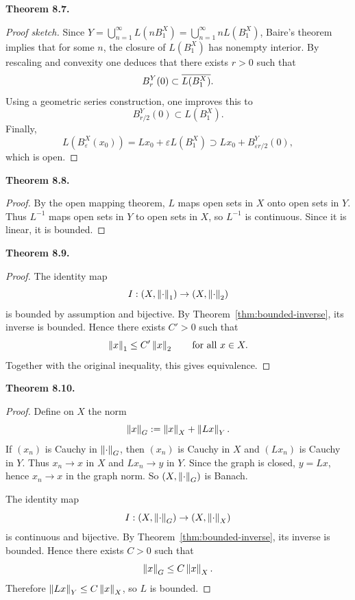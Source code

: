 \documentclass[11pt]{article}
\newenvironment{theoremstmt}[1]{%
  \par\medskip\noindent\textbf{Theorem #1. }\itshape
}{\par\medskip}
\begin{document}
\begin{theoremstmt}{8.7}
\thmOpenMapping
\end{theoremstmt}

\begin{proof}[Proof sketch]
Since $Y=\bigcup_{n=1}^{\infty}L(nB_1^X)=\bigcup_{n=1}^{\infty} nL(B_1^X)$, Baire's theorem implies that for some $n$, the closure of $L(B_1^X)$ has nonempty interior. By rescaling and convexity one deduces that there exists $r>0$ such that
\[
B_r^Y(0)\subset \overline{L(B_1^X)}.
\]
Using a geometric series construction, one improves this to
\[
B_{r/2}^Y(0)\subset L(B_1^X).
\]
Finally,
\[
L(B_\varepsilon^X(x_0))=Lx_0+\varepsilon L(B_1^X)
\supset Lx_0+B_{\varepsilon r/2}^Y(0),
\]
which is open.
\end{proof}

\begin{theoremstmt}{8.8}
\thmBoundedInverse
\end{theoremstmt}

\begin{proof}
By the open mapping theorem, $L$ maps open sets in $X$ onto open sets in $Y$. Thus $L^{-1}$ maps open sets in $Y$ to open sets in $X$, so $L^{-1}$ is continuous. Since it is linear, it is bounded.
\end{proof}

\begin{theoremstmt}{8.9}
\thmComparableNorms
\end{theoremstmt}

\begin{proof}
The identity map
\[
I:(X,\left\lVert \cdot\right\rVert_1)\to (X,\left\lVert \cdot\right\rVert_2)
\]
is bounded by assumption and bijective. By Theorem~\ref{thm:bounded-inverse}, its inverse is bounded. Hence there exists $C'>0$ such that
\[
\left\lVert x\right\rVert_1\le C'\left\lVert x\right\rVert_2 \qquad\text{for all }x\in X.
\]
Together with the original inequality, this gives equivalence.
\end{proof}

\begin{theoremstmt}{8.10}
\thmClosedGraph
\end{theoremstmt}

\begin{proof}
Define on $X$ the norm
\[
\left\lVert x\right\rVert_G:=\left\lVert x\right\rVert_X+\left\lVert Lx\right\rVert_Y.
\]
If $(x_n)$ is Cauchy in $\left\lVert \cdot\right\rVert_G$, then $(x_n)$ is Cauchy in $X$ and $(Lx_n)$ is Cauchy in $Y$. Thus $x_n\to x$ in $X$ and $Lx_n\to y$ in $Y$. Since the graph is closed, $y=Lx$, hence $x_n\to x$ in the graph norm. So $(X,\left\lVert \cdot\right\rVert_G)$ is Banach.

The identity map
\[
I:(X,\left\lVert \cdot\right\rVert_G)\to (X,\left\lVert \cdot\right\rVert_X)
\]
is continuous and bijective. By Theorem~\ref{thm:bounded-inverse}, its inverse is bounded. Hence there exists $C>0$ such that
\[
\left\lVert x\right\rVert_G\le C\left\lVert x\right\rVert_X.
\]
Therefore $\left\lVert Lx\right\rVert_Y\le C\left\lVert x\right\rVert_X$, so $L$ is bounded.
\end{proof}
\end{document}
